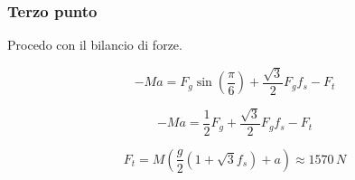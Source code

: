 \documentclass[main.tex]{subfiles}
\begin{document}
\subsubsection{Terzo punto}
Procedo con il bilancio di forze.

\begin{center}
\end{center}

\[
	-Ma = F_g\sin\left ( \dfrac{\pi}{6} \right ) + \dfrac{\sqrt{3}}{2}F_gf_s - F_t
\]

\[
	-Ma = \dfrac{1}{2}F_g + \dfrac{\sqrt{3}}{2}F_gf_s - F_t
\]

\[
	F_t = M\!\left(\dfrac{g}{2}(1+\sqrt{3}f_s) + a\right) \approx 1570\,N
\]
\end{document}
